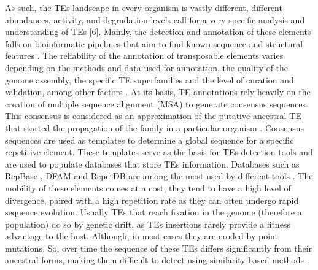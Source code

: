 \documentclass[unnumsec,webpdf,contemporary,large]{oup-authoring-template}%
\theoremstyle{thmstyleone}%
\theoremstyle{thmstyletwo}%
\theoremstyle{thmstylethree}%
\begin{document}
As such, the TEs landscape in every organism is vastly different, different abundances, activity, and degradation levels call for a very specific analysis and understanding of TEs [6]. Mainly, the detection and annotation of these elements falls on bioinformatic pipelines that aim to find known sequence and structural features \cite{branco_transposable_2023, ou_benchmarking_2019}. The reliability of the annotation of transposable elements varies depending on the methods and data used for annotation, the quality of the genome assembly, the specific TE superfamilies and the level of curation and validation, among other factors \cite{branco_transposable_2023}. At its basis, TE annotations rely heavily on the creation of multiple sequence alignment (MSA) to generate consensus sequences. This consensus is considered as an approximation of the putative ancestral TE that started the propagation of the family in a particular organism \cite{branco_transposable_2023, branco_overview_2023}. Consensus sequences are used as templates to determine a global sequence for a specific repetitive element. These templates serve as the basis for TEs detection tools and are used to populate databases that store TEs information. Databases such as RepBase \cite{bao_repbase_2015}, DFAM \cite{storer_dfam_2021} and RepetDB \cite{amselem_repetdb_2019} are among the most used by different tools \cite{branco_overview_2023, flynn_repeatmodeler2_2020}. The mobility of these elements comes at a cost, they tend to have a high level of divergence, paired with a high repetition rate as they can often undergo rapid sequence evolution. Usually TEs that reach fixation in the genome (therefore a population) do so by genetic drift, as TEs insertions rarely provide a fitness advantage to the host. Although, in most cases they are eroded by point mutations. So, over time the sequence of these TEs differs significantly from their ancestral forms, making them difficult to detect using similarity-based methods \cite{feschotte_dna_2007, bourque_ten_2018}.
\end{document}
